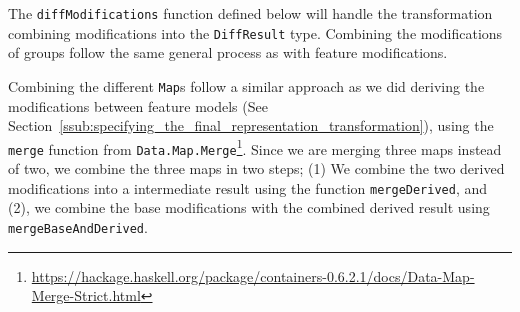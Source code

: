 \documentclass[a4paper,english]{ifimaster}
\begin{document}
The \texttt{diff\-Modifications} function defined below will handle the transformation combining modifications into the \texttt{DiffResult} type. Combining the modifications of groups follow the same general process as with feature modifications. 

Combining the different \texttt{Map}s follow a similar approach as we did deriving the modifications between feature models (See Section~\vref{ssub:specifying_the_final_representation_transformation}), using the \texttt{merge} function from \texttt{Data.Map.Merge}\footnote{\url{https://hackage.haskell.org/package/containers-0.6.2.1/docs/Data-Map-Merge-Strict.html}}. Since we are merging three maps instead of two, we combine the three maps in two steps; (1) We combine the two derived modifications into a intermediate result using the function \texttt{mergeDerived}, and (2), we combine the base modifications with the combined derived result using \texttt{merge\-Base\-And\-Derived}.
\end{document}
